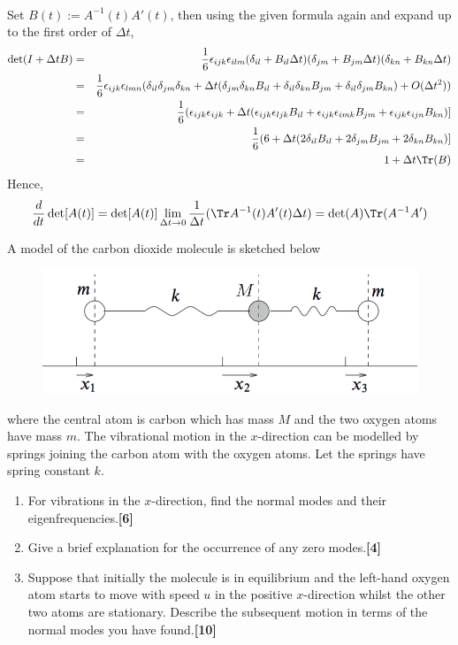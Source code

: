 \documentclass[a4paper]{article}
\begin{document}
\begin{ans}
\begin{enumerate}[label=(\roman*)]
\begin{eqnarray}
\end{eqnarray}
Set $B(t):=A^{-1}(t)A'(t)$, then using the given formula again and expand up to the first order of $\Delta t$,
\begin{eqnarray}
\det(I+\Delta tB)&=&\frac{1}{6}\epsilon_{ijk}\epsilon_{ilm}(\delta_{il}+B_{il}\Delta t)(\delta_{jm}+B_{jm}\Delta t)(\delta_{kn}+B_{kn}\Delta t)\nonumber\\&=&\frac{1}{6}\epsilon_{ijk}\epsilon_{lmn}(\delta_{il}\delta_{jm}\delta_{kn}+\Delta t(\delta_{jm}\delta_{kn}B_{il}+\delta_{il}\delta_{kn}B_{jm}+\delta_{il}\delta_{jm}B_{kn})+O(\Delta t^2))\nonumber\\&=&\frac{1}{6}(\epsilon_{ijk}\epsilon_{ijk}+\Delta t(\epsilon_{ijk}\epsilon_{ljk}B_{il}+\epsilon_{ijk}\epsilon_{imk}B_{jm}+\epsilon_{ijk}\epsilon_{ijn}B_{kn})]\nonumber\\&=&\frac{1}{6}(6+\Delta t(2\delta_{il} B_{il}+2\delta_{jm}B_{jm}+2\delta_{kn}B_{kn})]\nonumber\\&=&1+\Delta t\Tr(B)\nonumber
\end{eqnarray}
Hence,
$$\frac{d}{dt}\det[A(t)]=\det[A(t)]\lim_{\Delta t\rightarrow 0}\frac{1}{\Delta t}(\Tr A^{-1}(t)A'(t)\Delta t)=\det(A)\Tr(A^{-1}A')$$
\end{enumerate}
\end{ans}
\begin{qns}
A model of the carbon dioxide molecule is sketched below
\begin{figure}[H]
    \centering
    \includegraphics[scale=0.7]{2012P2Q7.PNG}
\end{figure}
where the central atom is carbon which has mass $M$ and the two oxygen atoms have mass $m$. The vibrational motion in the $x$-direction can be modelled by springs joining the carbon atom with the oxygen atoms. Let the springs have spring constant $k$. 
\begin{enumerate}[label=(\roman*)]
\item For vibrations in the $x$-direction, find the normal modes and their eigenfrequencies.\hfill\textbf{[6]}
\item Give a brief explanation for the occurrence of any zero modes.\hfill\textbf{[4]}
\item Suppose that initially the molecule is in equilibrium and the left-hand oxygen atom starts to move with speed $u$ in the positive $x$-direction whilst the other two atoms are stationary. Describe the subsequent motion in terms of the normal modes you have found.\hfill\textbf{[10]}
\end{enumerate}
\end{qns}
\end{document}
